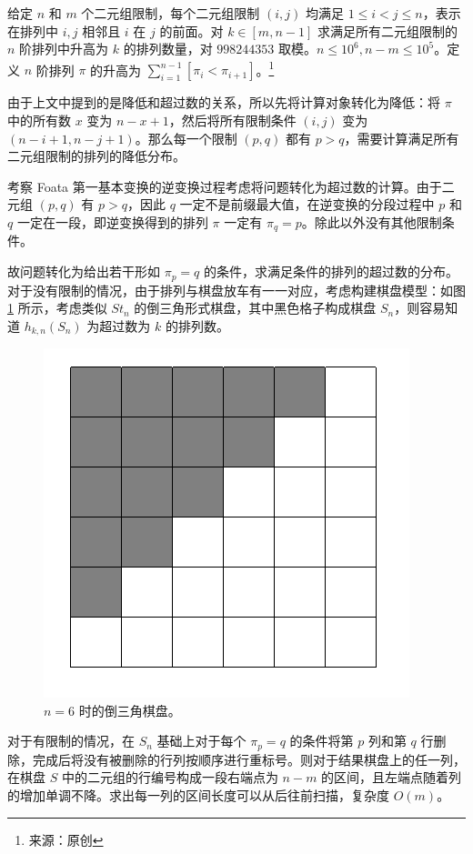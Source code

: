 \documentclass{noithesis}
\begin{document}
	\begin{problem}
		给定 $n$ 和 $m$ 个二元组限制，每个二元组限制 $(i,j)$ 均满足 $1 \leq i<j \leq n$，表示在排列中 $i,j$ 相邻且 $i$ 在 $j$ 的前面。对 $k \in [m,n-1]$ 求满足所有二元组限制的 $n$ 阶排列中升高为 $k$ 的排列数量，对 $998244353$ 取模。$n \leq 10^6,n-m \leq 10^5$。定义 $n$ 阶排列 $\pi$ 的升高为 $\sum_{i=1}^{n-1} [\pi_i < \pi_{i+1}]$。\footnote{来源：原创}
	\end{problem}
	
	由于上文中提到的是降低和超过数的关系，所以先将计算对象转化为降低：将 $\pi$ 中的所有数 $x$ 变为 $n-x+1$，然后将所有限制条件 $(i,j)$ 变为 $(n-i+1,n-j+1)$。那么每一个限制 $(p,q)$ 都有 $p>q$，需要计算满足所有二元组限制的排列的降低分布。
	
	考察 Foata 第一基本变换的逆变换过程考虑将问题转化为超过数的计算。由于二元组 $(p,q)$ 有 $p>q$，因此 $q$ 一定不是前缀最大值，在逆变换的分段过程中 $p$ 和 $q$ 一定在一段，即逆变换得到的排列 $\pi$ 一定有 $\pi_q = p$。除此以外没有其他限制条件。
	
	故问题转化为给出若干形如 $\pi_p=q$ 的条件，求满足条件的排列的超过数的分布。对于没有限制的情况，由于排列与棋盘放车有一一对应，考虑构建棋盘模型：如图 \ref{f9} 所示，考虑类似 $St_n$ 的倒三角形式棋盘，其中黑色格子构成棋盘 $S_n$，则容易知道 $h_{k,n}(S_n)$ 为超过数为 $k$ 的排列数。
	
	\begin{figure}[h]
		\centering
		\caption{$n=6$ 时的倒三角棋盘。}
		\label{f9}
		\includegraphics[scale=0.35]{picture/figure9.png}
	\end{figure}
	
	对于有限制的情况，在 $S_n$ 基础上对于每个 $\pi_p = q$ 的条件将第 $p$ 列和第 $q$ 行删除，完成后将没有被删除的行列按顺序进行重标号。则对于结果棋盘上的任一列，在棋盘 $S$ 中的二元组的行编号构成一段右端点为 $n-m$ 的区间，且左端点随着列的增加单调不降。求出每一列的区间长度可以从后往前扫描，复杂度 $O(m)$。
	
\end{document}
